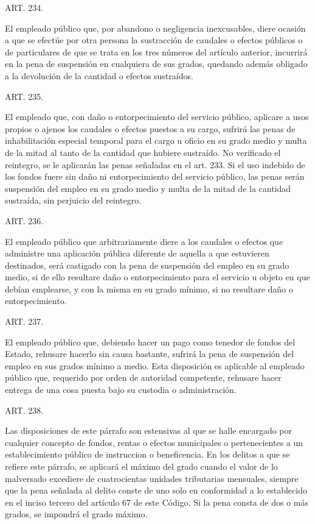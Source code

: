     ART. 234.

    El empleado público que, por abandono o negligencia inexcusables, diere ocasión a que se efectúe por otra persona la sustracción de caudales o efectos públicos o de particulares de que se trata en los tres números del artículo anterior, incurrirá en la pena de suspensión en cualquiera de sus grados, quedando además obligado a la devolución de la cantidad o efectos sustraídos.



    ART. 235.

    El empleado que, con daño o entorpecimiento del servicio público, aplicare a usos propios o ajenos los caudales o efectos puestos a su cargo, sufrirá las penas de inhabilitación especial temporal para el cargo u oficio en su grado medio y multa de la mitad al tanto de la cantidad que hubiere sustraído.
    No verificado el reintegro, se le aplicarán las penas señaladas en el art. 233.
    Si el uso indebido de los fondos fuere sin daño ni entorpecimiento del servicio público, las penas serán suspensión del empleo en su grado medio y multa de la mitad de la cantidad sustraída, sin perjuicio del reintegro.




    ART. 236.

    El empleado público que arbitrariamente diere a los caudales o efectos que administre una aplicación pública diferente de aquella a que estuvieren destinados, será castigado con la pena de suspensión del empleo en su grado medio, si de ello resultare daño o entorpecimiento para el servicio u objeto en que debían emplearse, y con la misma en su grado mínimo, si no resultare daño o entorpecimiento.


    ART. 237.

    El empleado público que, debiendo hacer un pago como tenedor de fondos del Estado, rehusare hacerlo sin causa bastante, sufrirá la pena de suspensión del empleo en sus grados mínimo a medio.
    Esta disposición es aplicable al empleado público que, requerido por orden de autoridad competente, rehusare hacer entrega de una cosa puesta bajo su custodia o administración.



    ART. 238.

    Las disposiciones de este párrafo son estensivas al que se halle encargado por cualquier concepto de fondos, rentas o efectos municipales o pertenecientes a un establecimiento público de instruccion o beneficencia.
    En los delitos a que se refiere este párrafo, se aplicará el máximo del grado cuando el valor de lo malversado excediere de cuatrocientas unidades tributarias mensuales, siempre que la pena señalada al delito conste de uno solo en conformidad a lo establecido en el inciso tercero del artículo 67 de este Código. Si la pena consta de dos o más grados, se impondrá el grado máximo.




